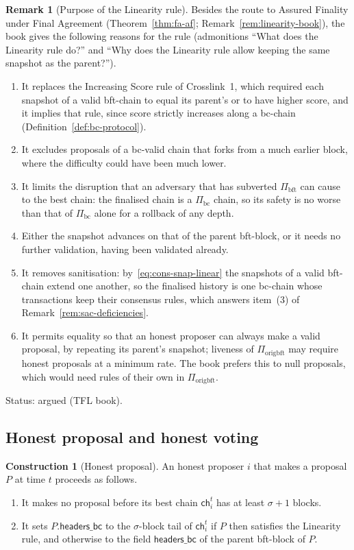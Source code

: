 \documentclass[11pt,a4paper]{article}
\theoremstyle{definition}
\newtheorem{construction}[theorem]{Construction}
\newtheorem{remark}[theorem]{Remark}
\newcommand{\bc}{\mathrm{bc}}
\newcommand{\bft}{\mathrm{bft}}
\newcommand{\ch}{\mathsf{ch}}
\newcommand{\Piorigbft}{\Pi_{\mathrm{origbft}}}
\newcommand{\Pibc}{\Pi_{\bc}}
\newcommand{\Pibft}{\Pi_{\bft}}
\newcommand{\headersbc}{\mathsf{headers\_bc}}
\begin{document}
\begin{remark}[Purpose of the Linearity rule]\label{rem:linearity-purpose}
Besides the route to Assured Finality under Final Agreement
(Theorem~\ref{thm:fa-af}; Remark~\ref{rem:linearity-book}), the book gives
the following reasons for the rule (admonitions ``What does the Linearity
rule do?'' and ``Why does the Linearity rule allow keeping the same snapshot
as the parent?'').
\begin{enumerate}[label=(\alph*)]
\item It replaces the Increasing Score rule of Crosslink~1, which required
  each snapshot of a valid bft-chain to equal its parent's or to have higher
  score, and it implies that rule, since score strictly increases along a
  bc-chain (Definition~\ref{def:bc-protocol}).
\item It excludes proposals of a bc-valid chain that forks from a much
  earlier block, where the difficulty could have been much lower.
\item It limits the disruption that an adversary that has subverted $\Pibft$
  can cause to the best chain: the finalised chain is a $\Pibc$ chain, so its
  safety is no worse than that of $\Pibc$ alone for a rollback of any depth.
\item Either the snapshot advances on that of the parent bft-block, or it
  needs no further validation, having been validated already.
\item It removes sanitisation: by~\eqref{eq:cons-snap-linear} the snapshots
  of a valid bft-chain extend one another, so the finalised history is one
  bc-chain whose transactions keep their consensus rules, which answers
  item~(3) of Remark~\ref{rem:sac-deficiencies}.
\item It permits equality so that an honest proposer can always make a valid
  proposal, by repeating its parent's snapshot; liveness of $\Piorigbft$ may
  require honest proposals at a minimum rate. The book prefers this to null
  proposals, which would need rules of their own in $\Piorigbft$.
\end{enumerate}

Status: argued (TFL book).
\end{remark}

\subsection{Honest proposal and honest voting}\label{sec:cons-bft-honest}

\begin{construction}[Honest proposal]\label{def:honest-proposal}
An honest proposer $i$ that makes a proposal $P$ at time $t$ proceeds as
follows.
\begin{enumerate}[label=(\roman*)]
\item It makes no proposal before its best chain $\ch_i^t$ has at least
  $\sigma + 1$ blocks.
\item It sets $P.\headersbc$ to the $\sigma$-block tail of $\ch_i^t$ if $P$
  then satisfies the Linearity rule, and otherwise to the field $\headersbc$
  of the parent bft-block of $P$.
\end{enumerate}
\end{construction}
\end{document}
